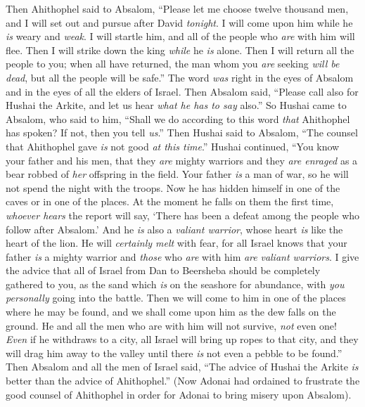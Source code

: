 \begin{biblechapter} %
 Then Ahithophel said to Absalom, “Please let me choose twelve thousand men, and I will set out and pursue after David \textit{tonight}.
\verse I will come upon him while he \textit{is} weary and \textit{weak}. I will startle him, and all of the people who \textit{are} with him will flee. Then I will strike down the king \textit{while} he \textit{is} alone.
\verse Then I will return all the people to you; when all have returned, the man whom you \textit{are} seeking \textit{will be dead}, but all the people will be safe.”
\verse The word \textit{was} right in the eyes of Absalom and in the eyes of all the elders of Israel.
\verse Then Absalom said, “Please call also for Hushai the Arkite, and let us hear \textit{what he has to say} also.”
\verse So Hushai came to Absalom, who said to him, “Shall we do according to this word \textit{that} Ahithophel has spoken? If not, then you tell \textit{us}.”
\verse Then Hushai said to Absalom, “The counsel that Ahithophel gave \textit{is} not good \textit{at this time}.”
\verse Hushai continued, “You know your father and his men, that they \textit{are} mighty warriors and they \textit{are enraged} as a bear robbed of \textit{her} offspring in the field. Your father \textit{is} a man of war, so he will not spend the night with the troops.
\verse Now he has hidden himself in one of the caves or in one of the places. At the moment he falls on them the first time, \textit{whoever hears} the report will say, ‘There has been a defeat among the people who follow after Absalom.’
\verse And he \textit{is} also a \textit{valiant warrior}, whose heart \textit{is} like the heart of the lion. He will \textit{certainly melt} with fear, for all Israel knows that your father \textit{is} a mighty warrior and \textit{those} who \textit{are} with him \textit{are} \textit{valiant warriors}.
\verse I give the advice that all of Israel from Dan to Beersheba should be completely gathered to you, as the sand which \textit{is} on the seashore for abundance, with \textit{you personally} going into the battle.
\verse Then we will come to him in one of the places where he may be found, and we shall come upon him as the dew falls on the ground. He and all the men who are with him will not survive, \textit{not} even one!
\verse \textit{Even} if he withdraws to a city, all Israel will bring up ropes to that city, and they will drag him away to the valley until there \textit{is} not even a pebble to be found.”
\verse Then Absalom and all the men of Israel said, “The advice of Hushai the Arkite \textit{is} better than the advice of Ahithophel.” (Now Adonai had ordained to frustrate the good counsel of Ahithophel in order for Adonai to bring misery upon Absalom).

\end{biblechapter}

